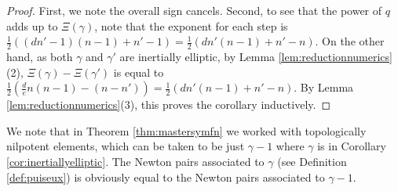 \documentclass{amsart}
\numberwithin{equation}{section}
\theoremstyle{definition}
\newcommand{\Z}{{\mathbb Z}}
\begin{document}
\begin{proof}
    
    First, we note the overall sign cancels. 
    Second, to see that the power of $q$ adds up to $\Xi(\gamma)$, note that the exponent for each step is $\frac{1}{2}((dn'-1)(n-1)+n'-1)=\frac{1}{2}(dn'(n-1)+n'-n)$. On the other hand, as both $\gamma$ and $\gamma'$ are inertially elliptic, by Lemma \ref{lem:reductionnumerics}(2), $\Xi(\gamma)-\Xi(\gamma')$ is equal to $\frac{1}{2}(\frac{d}{e}n(n-1)-(n-n'))=\frac{1}{2}(dn'(n-1)+n'-n)$.
    By Lemma \ref{lem:reductionnumerics}(3), this proves the corollary inductively.
\end{proof}

    We note that in Theorem \ref{thm:mastersymfn} we worked with topologically nilpotent elements, which can be taken to be just $\gamma-1$ where $\gamma$ is in Corollary \ref{cor:inertiallyelliptic}. The Newton pairs associated to $\gamma$ (see Definition \ref{def:puiseux}) is obviously equal to the Newton pairs associated to $\gamma-1$.
\end{document}
